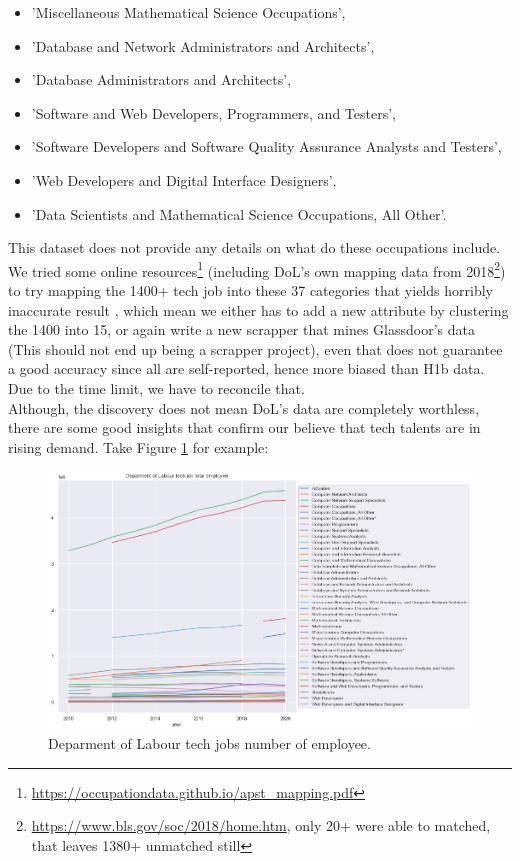 {\begin{itemize}
	\item	'Miscellaneous Mathematical Science Occupations',
	\item	'Database and Network Administrators and Architects',
	\item	'Database Administrators and Architects',
	\item	'Software and Web Developers, Programmers, and Testers',
	\item	'Software Developers and Software Quality Assurance Analysts and Testers',
	\item	'Web Developers and Digital Interface Designers',
	\item	'Data Scientists and Mathematical Science Occupations, All Other'.
\end{itemize}
}

This dataset does not provide any details on what do these occupations include. We tried some online resources\footnote{\url{https://occupationdata.github.io/apst_mapping.pdf}} (including DoL's own mapping data from 2018\footnote{\url{https://www.bls.gov/soc/2018/home.htm}, only 20+ were able to  matched, that leaves 1380+ unmatched still }) to try mapping the 1400+ tech job into these 37 categories that yields horribly inaccurate result , which mean we either has to add a new attribute by clustering the 1400 into 15, or again write a new scrapper that mines Glassdoor's data (This should not end up being a scrapper project), even that does not guarantee a good  accuracy since all are self-reported, hence  more biased than H1b data. Due to the time limit, we have to reconcile that. \\
Although, the discovery does not mean DoL's data are completely worthless, there are some good insights that confirm our believe that tech talents are in rising demand. Take Figure \ref{dolnumofemployee} for example:
\begin{figure}[h]
	\begin{center}
		\includegraphics[width=\linewidth]{./photos/totaltech.png}
	\end{center}
	\caption{Deparment of Labour tech jobs number of employee.}
	\label{dolnumofemployee}
	\end{figure}
